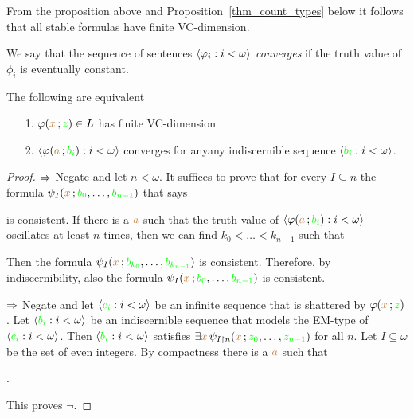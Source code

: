 From the proposition above and Proposition~\ref{thm_count_types} below it follows that all stable formulas have finite VC-dimension.

We say that the sequence of sentences $\langle\varphi_i:i<\omega\rangle$ \emph{converges\/} if the truth value of $\phi_i$ is eventually constant.

\begin{lemma}\label{lem_altrank}
The following are equivalent
\begin{itemize}
\item[1.] $\varphi({\color{brown} x}\,;{\color{green} z})\in L$ has finite VC-dimension
\item[2.] $\langle\varphi({\color{brown} a}\,;{\color{green} b_i}):i<\omega\rangle$ converges for anyany indiscernible sequence $\langle{\color{green}b_i}:i<\omega\rangle$.
\end{itemize}
\end{lemma}

\begin{proof}
$\Rightarrow$ Negate  and let $n<\omega$. It suffices to prove that for every $I\subseteq n$ the formula $\psi_{I}({\color{brown} x}\,;{\color{green} b_0},\dots,{\color{green} b_{n-1}} )$ that says 


is consistent. If there is a ${\color{brown} a}$ such that the truth value of $\langle\varphi({\color{brown} a}\,;{\color{green} b_i}):i<\omega\rangle$ oscillates at least $n$ times, then we can find $k_0<\dots<k_{n-1}$ such that 


Then the formula $\psi_{I}({\color{brown} x}\,;{\color{green} b_{k_0}},\dots,{\color{green} b_{k_{n-1}}})$ is consistent.
Therefore, by indiscernibility, also the formula  $\psi_{I}({\color{brown} x}\,;{\color{green} b_0},\dots,{\color{green} b_{n-1}})$ is consistent.

$\Rightarrow$
Negate  and let  $\langle{\color{green}c_i}:i<\omega\rangle$ be an infinite sequence that is shattered by $\varphi({\color{brown} x}\,;{\color{green} z})$.
Let  $\langle{\color{green}b_i}:i<\omega\rangle$ be an indiscernible sequence that models the EM-type of $\langle{\color{green}c_i}:i<\omega\rangle$. Then $\langle{\color{green}b_i}:i<\omega\rangle$ satisfies $\exists{\color{brown}x}\,\psi_{I\restriction n}({\color{brown} x}\,;{\color{green} z_0},\dots,{\color{green} z_{n-1}})$ for all $n$. 
Let $I\subseteq\omega$ be the set of even integers.
By compactness there is a ${\color{brown} a}$ such that

.

This proves $\neg$.
\end{proof}

